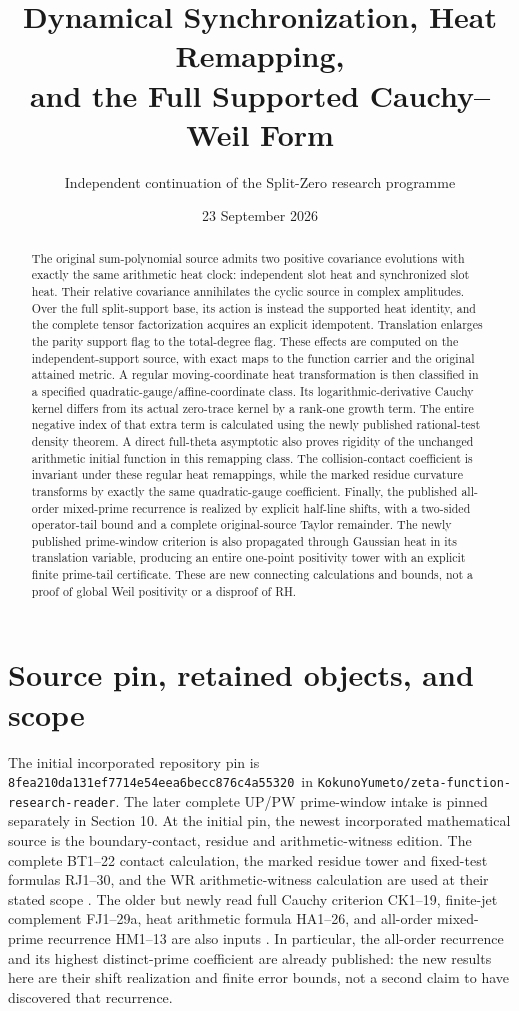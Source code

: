 \documentclass[11pt,a4paper]{article}
\title{Dynamical Synchronization, Heat Remapping,\\and the Full Supported Cauchy--Weil Form}
\author{Independent continuation of the Split-Zero research programme}
\date{23 September 2026}
\theoremstyle{definition}\newtheorem{definition}[theorem]{Definition}
\newcommand{\pin}{\texttt{8fea210da131ef7714e54eea6becc876c4a55320}}
\begin{document}
\maketitle
\begin{abstract}
The original sum-polynomial source admits two positive covariance evolutions with exactly the same arithmetic heat clock: independent slot heat and synchronized slot heat. Their relative covariance annihilates the cyclic source in complex amplitudes. Over the full split-support base, its action is instead the supported heat identity, and the complete tensor factorization acquires an explicit idempotent. Translation enlarges the parity support flag to the total-degree flag. These effects are computed on the independent-support source, with exact maps to the function carrier and the original attained metric. A regular moving-coordinate heat transformation is then classified in a specified quadratic-gauge/affine-coordinate class. Its logarithmic-derivative Cauchy kernel differs from its actual zero-trace kernel by a rank-one growth term. The entire negative index of that extra term is calculated using the newly published rational-test density theorem. A direct full-theta asymptotic also proves rigidity of the unchanged arithmetic initial function in this remapping class. The collision-contact coefficient is invariant under these regular heat remappings, while the marked residue curvature transforms by exactly the same quadratic-gauge coefficient. Finally, the published all-order mixed-prime recurrence is realized by explicit half-line shifts, with a two-sided operator-tail bound and a complete original-source Taylor remainder. The newly published prime-window criterion is also propagated through Gaussian heat in its translation variable, producing an entire one-point positivity tower with an explicit finite prime-tail certificate. These are new connecting calculations and bounds, not a proof of global Weil positivity or a disproof of RH.
\end{abstract}
\setcounter{tocdepth}{1}\tableofcontents\newpage

\section{Source pin, retained objects, and scope}
The initial incorporated repository pin is \pin\ in \texttt{KokunoYumeto/zeta-function-research-reader}. The later complete UP/PW prime-window intake is pinned separately in Section 10. At the initial pin, the newest incorporated mathematical source is the boundary-contact, residue and arithmetic-witness edition. The complete BT1--22 contact calculation, the marked residue tower and fixed-test formulas RJ1--30, and the WR arithmetic-witness calculation are used at their stated scope \cite{BT}. The older but newly read full Cauchy criterion CK1--19, finite-jet complement FJ1--29a, heat arithmetic formula HA1--26, and all-order mixed-prime recurrence HM1--13 are also inputs \cite{CK,FJ,HA,HM}. In particular, the all-order recurrence and its highest distinct-prime coefficient are already published: the new results here are their shift realization and finite error bounds, not a second claim to have discovered that recurrence.
\end{document}

